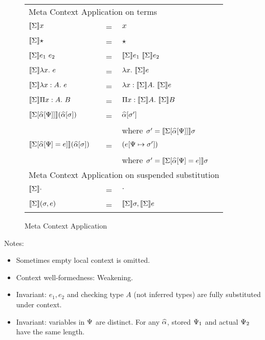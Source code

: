 
\begin{figure}
    \begin{tabular}{lll}
      \multicolumn{3}{l}{Meta Context Application on terms}\\
        $\llbracket{\Sigma}\rrbracket x $ & = & $x$ \\
        $\llbracket{\Sigma}\rrbracket \star $ & = & $\star$ \\
        $\llbracket{\Sigma}\rrbracket e_1 ~ e_2 $ & = & ${\llbracket{\Sigma}\rrbracket e_1} ~ {\llbracket{\Sigma}\rrbracket e_2}$ \\
        $\llbracket{\Sigma}\rrbracket \lambda {x}.~ e $ & = & $\lambda {x}.~ {\llbracket{\Sigma}\rrbracket e}$ \\
        $\llbracket{\Sigma}\rrbracket \lambda x:A.~ e $ & = & $\lambda x:\llbracket{\Sigma}\rrbracket A.~ {\llbracket{\Sigma}\rrbracket e}$ \\
        $\llbracket{\Sigma}\rrbracket \Pi x:A.~ B $ & = & $\Pi x:\llbracket{\Sigma}\rrbracket A.~ {\llbracket{\Sigma}\rrbracket B}$ \\
        $\llbracket{\Sigma[\widehat{\alpha}[\Psi]]}\rrbracket (\widehat{\alpha}[\sigma]) $ & = & $\widehat{\alpha}[\sigma'] $ \\
           & & where $\sigma' = \llbracket{\Sigma[\widehat{\alpha}[\Psi]]}\rrbracket \sigma$\\
        $\llbracket{\Sigma[\widehat{\alpha}[\Psi] = e]}\rrbracket (\widehat{\alpha}[\sigma]) $ & = & ${(e [\Psi \mapsto \sigma'])} $ \\
           & & where $\sigma' = \llbracket{\Sigma[\widehat{\alpha}[\Psi] = e]}\rrbracket \sigma$\\
      \multicolumn{3}{l}{Meta Context Application on suspended substitution}\\
        $\llbracket{\Sigma}\rrbracket \cdot $ & = & $\cdot$ \\
        $\llbracket{\Sigma}\rrbracket (\sigma, e) $ & = & $\llbracket{\Sigma}\rrbracket \sigma, \llbracket{\Sigma}\rrbracket e$ \\
    \end{tabular}
    \caption{Meta Context Application}
    \label{figure:erasure}
\end{figure}


Notes:
\begin{itemize}
  \item Sometimes empty local context is omitted.
  \item Context well-formedness: Weakening.
  \item Invariant: $e_1, e_2$ and checking type $A$ (not inferred types) are
    fully substituted under context.
    \item Invariant: variables in $\Psi$ are distinct. For any $\widehat{\alpha}$, stored
      $\Psi_1$ and actual $\Psi_2$ have the same length.
\end{itemize}

